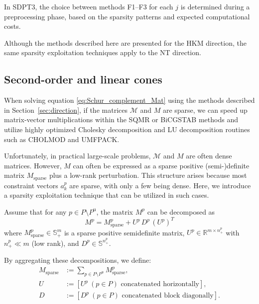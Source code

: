 In SDPT3, the choice between methods F1--F3 for each $j$ is determined during a preprocessing phase, based on the sparsity patterns and expected computational costs.

Although the methods described here are presented for the HKM direction, the same sparsity exploitation techniques apply to the NT direction.


\subsection{Second-order and linear cones} \label{sec:exploit_sparsity_socp_lp}
When solving equation \eqref{eq:Schur_complement_Mat} using the methods described in Section~\ref{sec:direction},
if the matrices $\mathcal{M}$ and $M$ are sparse, we can speed up matrix-vector multiplications within the SQMR or BiCGSTAB methods and utilize highly optimized Cholesky decomposition and LU decomposition routines such as CHOLMOD and UMFPACK.

Unfortunately, in practical large-scale problems, $\mathcal{M}$ and $M$ are often dense matrices. 
However, $M$ can often be expressed as a sparse positive (semi-)definite matrix $M_{\mathrm{sparse}}$ plus a low-rank perturbation.
This structure arises because most constraint vectors $a^p_k$ are sparse, with only a few being dense.
Here, we introduce a sparsity exploitation technique that can be utilized in such cases.

Assume that for any $p\in P\setminus P^{\text{u}}$, the matrix $M^p$ can be decomposed as
\begin{equation}
  M^p = M^p_{\mathrm{sparse}} + U^p\, D^p\, (U^p)^T
  \label{eq:low_rank_perturbation}
\end{equation}
where $M^p_{\mathrm{sparse}} \in \mathbb{S}^m_+$ is a sparse positive semidefinite matrix, 
$U^p \in \mathbb{R}^{m\times n^p_+}$ with $n^p_+ \ll m$ (low rank), 
and $D^p\in \mathbb{S}^{n^p_+}$.

By aggregating these decompositions, we define:
\begin{align}
  M_{\mathrm{sparse}} &:= \sum_{p\in P\setminus P^{\text{u}}} M^p_{\mathrm{sparse}}, \\
  U &:= [U^p ~ (p\in P) \text{ concatenated horizontally}], \\
  D &:= [D^p ~ (p\in P) \text{ concatenated block diagonally}].
\end{align}

